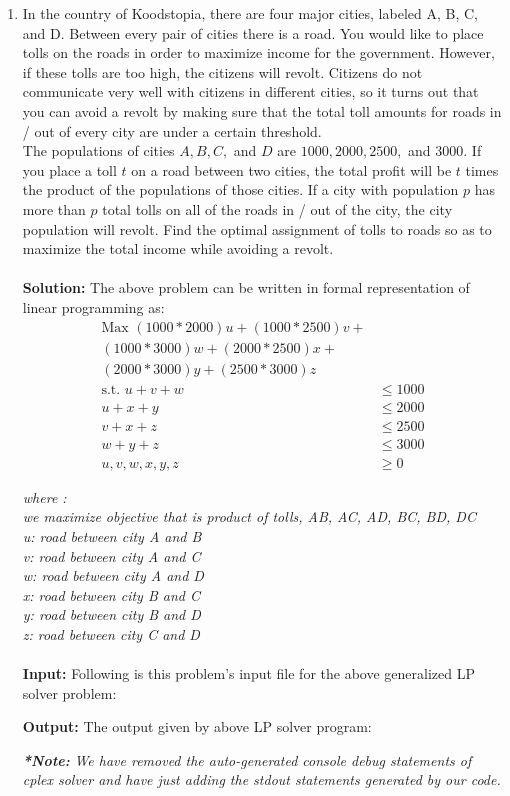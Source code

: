 \documentclass[12pt]{article}
\begin{document}
\begin{enumerate}
\begin{enumerate}
\item In the country of Koodstopia, there are four major cities, labeled A, B, C, and D. Between every pair of cities there is a road. You would like to place tolls on the roads in order to maximize income for the government. However, if these tolls are too high, the citizens will revolt. Citizens do not communicate very well with citizens in different cities, so it turns out that you can avoid a revolt by making sure that the total toll amounts for roads in / out of every city are under a certain threshold.\\
The populations of cities $A, B, C,$ and $D$ are $1000,2000,2500,$ and $3000$. If you place a toll $t$ on a road between two cities, the total profit will be $t$ times the product of the populations of those cities. If a city with population $p$ has more than $p$ total tolls on all of the roads in / out of the city, the city population will revolt. Find the optimal assignment of tolls to roads so as to maximize the total income while avoiding a revolt. \\
\pagebreak
\\
\textbf{Solution:} The above problem can be written in formal representation of linear programming as:
\begin{align*}
\text{Max } (1000 * 2000)u + (1000 * 2500)v +\\
(1000 * 3000)w + (2000 * 2500)x +\\
(2000 * 3000)y + (2500 * 3000)z\\
\text{s.t. } u + v + 
w &\leq 1000\\
u + x + 
y &\leq 2000\\
v + x +
z &\leq 2500\\
w + y + 
z &\leq 3000\\
u,v,w,x,y,z &\geq 0
\end{align*}

\textit{where :\\
	we maximize objective that is product of tolls, AB, AC, AD, BC, BD, DC\\
	u: road between city A and B\\
	v: road between city A and C\\
	w: road between city A and D\\
	x: road between city B and C\\
	y: road between city B and D\\
	z: road between city C and D}\\
\\
\textbf{Input:} Following is this problem's input file for the above generalized LP solver problem: 

\textbf{Output:} The output given by above LP solver program:


\textbf{\textit{*Note:}} \textit{We have removed the auto-generated console debug statements of cplex solver and have just adding the stdout statements generated by our code.}
\end{enumerate}
\end{enumerate}
\end{document}
